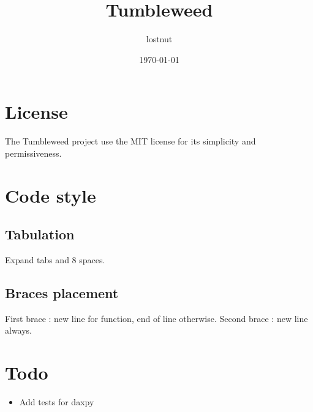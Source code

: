 

\title{Tumbleweed}
\author{lostnut}
\date{\today}


\maketitle
\tableofcontents

\section{License}%
\label{sec:license}

The Tumbleweed project use the MIT license for its simplicity and permissiveness.

\section{Code style}%
\label{sec:code_style}

\subsection{Tabulation}%
\label{sub:tabulation}

Expand tabs and 8 spaces.

\subsection{Braces placement}%
\label{sub:braces_placement}

First brace : new line for function, end of line otherwise.
Second brace : new line always.

\section{Todo}%
\label{sec:todo}

\begin{itemize}
        \item Add tests for daxpy
\end{itemize}

